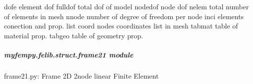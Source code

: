 \documentclass[letterpaper,10pt,english]{sphinxmanual}
\begin{document}
\begin{fulllineitems}
\begin{fulllineitems}
\begin{description}
\sphinxAtStartPar
dofe              \textendash{} element dof
fulldof           \textendash{} total dof of model
nodedof           \textendash{} node dof 
nelem             \textendash{} total number of elements in mesh
nnode             \textendash{} number of degree of freedom per node
inci              \textendash{} elements conection and prop. list
coord             \textendash{} nodes coordinates list in mesh
tabmat            \textendash{} table of material prop.
tabgeo            \textendash{} table of geometry prop.

\end{description}

\end{fulllineitems}


\end{fulllineitems}



\subparagraph{myfempy.felib.struct.frame21 module}
\label{\detokenize{myfempy.felib.struct:module-myfempy.felib.struct.frame21}}\label{\detokenize{myfempy.felib.struct:myfempy-felib-struct-frame21-module}}
\sphinxAtStartPar
frame21.py: Frame 2D 2\sphinxhyphen{}node linear Finite Element
\end{document}
